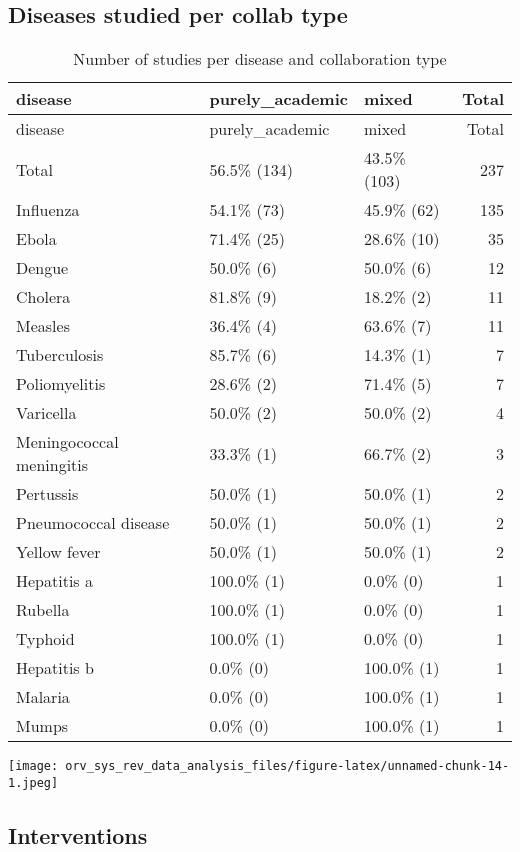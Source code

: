 \documentclass[
]{article}
\begin{document}
\hypertarget{diseases-studied-per-collab-type}{%
\subsection{Diseases studied per collab
type}\label{diseases-studied-per-collab-type}}

\begin{longtable}[]{@{}lllr@{}}
\caption{Number of studies per disease and collaboration
type}\tabularnewline
\toprule
disease & purely\_academic & mixed & Total \\
\midrule
\endfirsthead
\toprule
disease & purely\_academic & mixed & Total \\
\midrule
\endhead
Total & 56.5\% (134) & 43.5\% (103) & 237 \\
Influenza & 54.1\% (73) & 45.9\% (62) & 135 \\
Ebola & 71.4\% (25) & 28.6\% (10) & 35 \\
Dengue & 50.0\% (6) & 50.0\% (6) & 12 \\
Cholera & 81.8\% (9) & 18.2\% (2) & 11 \\
Measles & 36.4\% (4) & 63.6\% (7) & 11 \\
Tuberculosis & 85.7\% (6) & 14.3\% (1) & 7 \\
Poliomyelitis & 28.6\% (2) & 71.4\% (5) & 7 \\
Varicella & 50.0\% (2) & 50.0\% (2) & 4 \\
Meningococcal meningitis & 33.3\% (1) & 66.7\% (2) & 3 \\
Pertussis & 50.0\% (1) & 50.0\% (1) & 2 \\
Pneumococcal disease & 50.0\% (1) & 50.0\% (1) & 2 \\
Yellow fever & 50.0\% (1) & 50.0\% (1) & 2 \\
Hepatitis a & 100.0\% (1) & 0.0\% (0) & 1 \\
Rubella & 100.0\% (1) & 0.0\% (0) & 1 \\
Typhoid & 100.0\% (1) & 0.0\% (0) & 1 \\
Hepatitis b & 0.0\% (0) & 100.0\% (1) & 1 \\
Malaria & 0.0\% (0) & 100.0\% (1) & 1 \\
Mumps & 0.0\% (0) & 100.0\% (1) & 1 \\
\bottomrule
\end{longtable}

\texttt{[image: orv\_sys\_rev\_data\_analysis\_files/figure-latex/unnamed-chunk-14-1.jpeg]}

\hypertarget{interventions}{%
\subsection{Interventions}\label{interventions}}
\end{document}
